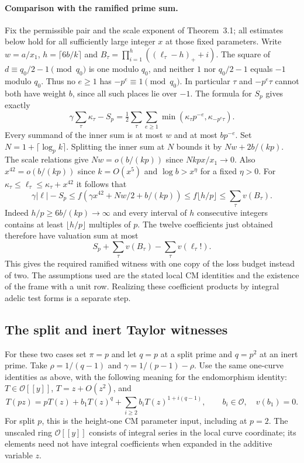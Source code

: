 \paragraph{Comparison with the ramified prime sum.}
Fix the permissible pair and the scale exponent of Theorem~3.1; all estimates
below hold for all sufficiently large integer $x$ at those fixed parameters.
Write $w=a/x_1$, $h=\lceil 6b/k\rceil$ and
$B_\tau=\prod_{i=1}^h((\ell_\tau-h)_++i)$.
The square of $d\equiv q_0/2-1\pmod{q_0}$ is one modulo $q_0$,
and neither $1$ nor $q_0/2-1$ equals $-1$ modulo $q_0$.
Thus no $e\ge1$ has $-p^e\equiv1\pmod{q_0}$.
In particular $\tau$ and $-p^e\tau$ cannot both have weight $b$,
since all such places lie over $-1$. The formula for $S_p$ gives exactly
\[
 \gamma\sum_\tau\kappa_\tau-S_p
 =\tfrac12\sum_\tau\sum_{e\ge1}
       \min(\kappa_\tau p^{-e},\kappa_{-p^e\tau}).
\]
Every summand of the inner sum is at most $w$ and at most $bp^{-e}$.
Set $N=1+\lceil\log_p k\rceil$. Splitting the inner sum at $N$ bounds it
by $Nw+2b/(kp)$. The scale relations give
$Nw=o(b/(kp))$ since $N k p x/x_1\to0$. Also
$x^{42}=o(b/(kp))$ since $k=O(x^5)$ and $\log b>x^\eta$
for a fixed $\eta>0$.
For $\kappa_\tau\le\ell_\tau\le\kappa_\tau+x^{42}$ it follows that
\[
 \gamma |\ell|-S_p\le f\left(\gamma x^{42}+Nw/2+b/(kp)\right)
 \le f\big\lfloor h/p\big\rfloor
 \le\sum_\tau v(B_\tau).
\]
Indeed $h/p\ge6b/(kp)\to\infty$ and every interval of $h$
consecutive integers contains at least $\lfloor h/p\rfloor$ multiples of $p$.
The twelve coefficients just obtained therefore have valuation sum at most
\[
 S_p+\sum_\tau v(B_\tau)-\sum_\tau v(\ell_\tau!).
\]
This gives the required ramified witness with one copy of the loss budget
instead of two. The assumptions used are the stated local CM identities
and the existence of the frame with a unit row. Realizing these coefficient
products by integral adelic test forms is a separate step.

\subsection{The split and inert Taylor witnesses}
\label{sec:other-witnesses}

For these two cases set $\pi=p$ and let $q=p$ at a split prime and
$q=p^2$ at an inert prime. Take $\rho=1/(q-1)$ and
$\gamma=1/(p-1)-\rho$. Use the same one-curve identities as above,
with the following meaning for the endomorphism identity:
$T\in\mathcal O[[y]]$, $T=z+O(z^2)$, and
\[
 T(pz)=pT(z)+b_1T(z)^q+
           \sum_{i\ge2}b_iT(z)^{1+i(q-1)},\qquad
 b_i\in\mathcal O,\quad v(b_1)=0.
\]
For split $p$, this is the height-one CM parameter input, including at
$p=2$. The unscaled ring $\mathcal O[[y]]$ consists of integral
series in the local curve coordinate; its elements need not have integral
coefficients when expanded in the additive variable $z$.

